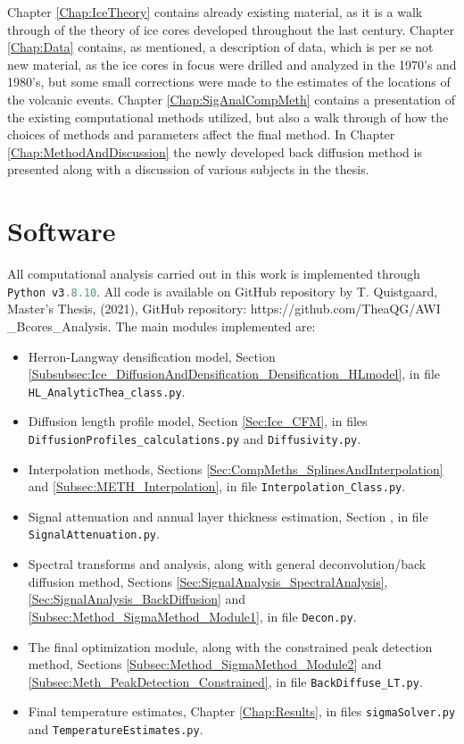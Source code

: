 \documentclass[../../CompleteThesis2/Complete_2ndDraft]{subfiles}
\begin{document}
Chapter \ref{Chap:IceTheory} contains already existing material, as it is a walk through of the theory of ice cores developed throughout the last century. Chapter \ref{Chap:Data} contains, as mentioned, a description of data, which is per se not new material, as the ice cores in focus were drilled and analyzed in the 1970's and 1980's, but some small corrections were made to the estimates of the locations of the volcanic events. Chapter \ref{Chap:SigAnalCompMeth} contains a presentation of the existing computational methods utilized, but also a walk through of how the choices of methods and parameters affect the final method. In Chapter \ref{Chap:MethodAndDiscussion} the newly developed back diffusion method is presented along with a discussion of various subjects in the thesis. 

\section[Software]{Software}
All computational analysis carried out in this work is implemented through \lstinline[language=Python]|Python v3.8.10|. All code is available on GitHub repository by T. Quistgaard, Master's Thesis, (2021), GitHub repository: https://github.com/TheaQG/AWI \_Bcores\_Analysis.
The main modules implemented are: 
\begin{itemize}
	\item Herron-Langway densification model, Section \ref{Subsubsec:Ice_DiffusionAndDensification_Densification_HLmodel}, in file \lstinline[language=Python]|HL_AnalyticThea_class.py|.
	\item Diffusion length profile model, Section \ref{Sec:Ice_CFM}, in files \lstinline[language=Python]|DiffusionProfiles_calculations.py| and \lstinline[language=Python]|Diffusivity.py|.
	\item Interpolation methods, Sections \ref{Sec:CompMeths_SplinesAndInterpolation} and \ref{Subsec:METH_Interpolation}, in file \lstinline[language=Python]|Interpolation_Class.py|.
	\item Signal attenuation and annual layer thickness estimation, Section \label{Sec:SignalAnalysis_ALT}, in file \lstinline[language=Python]|SignalAttenuation.py|.
	\item Spectral transforms and analysis, along with general deconvolution/back diffusion method, Sections \ref{Sec:SignalAnalysis_SpectralAnalysis}, \ref{Sec:SignalAnalysis_BackDiffusion} and \ref{Subsec:Method_SigmaMethod_Module1}, in file \lstinline[language=Python]|Decon.py|.
	\item The final optimization module, along with the constrained peak detection method, Sections \ref{Subsec:Method_SigmaMethod_Module2} and \ref{Subsec:Meth_PeakDetection_Constrained}, in file \lstinline[language=Python]|BackDiffuse_LT.py|.
	\item Final temperature estimates, Chapter \ref{Chap:Results}, in files \lstinline[language=Python]|sigmaSolver.py| and \lstinline[language=Python]|TemperatureEstimates.py|.
\end{itemize}
\end{document}
